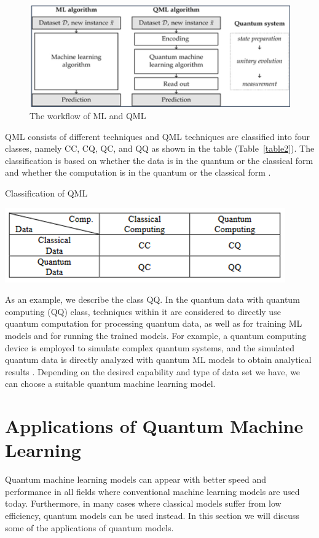 \documentclass[conference]{IEEEtran}
\begin{document}
\begin{figure}[htbp]
	\centerline{\includegraphics[scale=0.9]{qmlalgo.png}}
	\caption{The workflow of ML and QML \cite{b5}}
	\label{fig8}
\end{figure}

QML consists of different techniques and QML techniques are classified into four classes, namely CC, CQ, QC, and QQ as shown in the table (Table~\ref{table2}). The classification is based on whether the data is in the quantum or the classical form and whether the computation is in the quantum or the classical form \cite{b24}.

\begin{table}[htbp]
	\caption{Classification of QML \cite{b24}}
	\centerline{\includegraphics[scale=0.9]{class.png}}
	\label{table2}
\end{table}

As an example, we describe the class QQ. In the quantum data with quantum computing (QQ) class, techniques within it are considered to directly use quantum computation for processing quantum data, as well as for training ML models and for running the trained models. For example, a quantum computing device is employed to simulate complex quantum systems, and the simulated quantum data is directly analyzed with quantum ML models to obtain analytical results \cite{b24}. Depending on the desired capability and type of data set we have, we can choose a suitable quantum machine learning model.

\section{Applications of Quantum Machine Learning}
Quantum machine learning models can appear with better speed and performance in all fields where conventional machine learning models are used today. Furthermore, in many cases where classical models suffer from low efficiency, quantum models can be used instead. In this section we will discuss some of the applications of quantum models.
\end{document}
